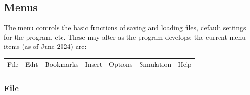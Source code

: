 \subsection{Menus}

\label{Menu}

The menu controls the basic functions of saving and loading files,
default settings for the program, etc. These may alter as the program
develops; the current menu items (as of June 2024) are:

\begin{tabular}{lllllll}
File  & Edit  & Bookmarks  & Insert  & Options  & Simulation  & Help \tabularnewline
\end{tabular}

\subsubsection{File}

